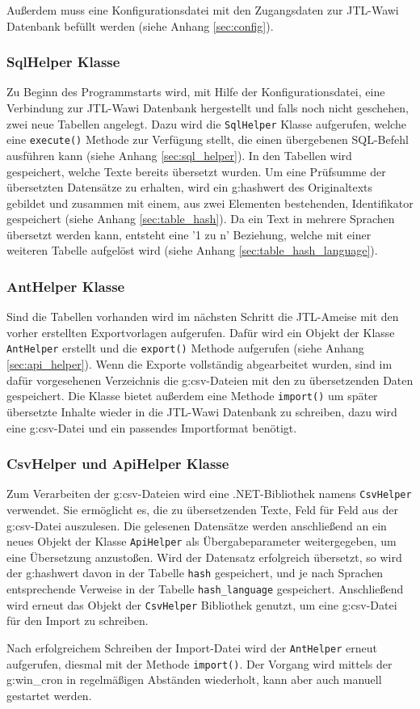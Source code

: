 Außerdem muss eine Konfigurationsdatei mit den Zugangsdaten zur JTL-Wawi Datenbank befüllt werden (siehe Anhang \ref{sec:config}).

\subsubsection{SqlHelper Klasse}
Zu Beginn des Programmstarts wird, mit Hilfe der Konfigurationsdatei, eine Verbindung zur JTL-Wawi Datenbank hergestellt und falls noch nicht geschehen, zwei neue Tabellen angelegt.
Dazu wird die \texttt{SqlHelper} Klasse aufgerufen, welche eine \texttt{execute()} Methode zur Verfügung stellt, die einen übergebenen SQL-Befehl ausführen kann (siehe Anhang \ref{sec:sql_helper}). 
In den Tabellen wird gespeichert, welche Texte bereits übersetzt wurden.
Um eine Prüfsumme der übersetzten Datensätze zu erhalten, wird ein \gls{g:hashwert} des Originaltexts gebildet und zusammen mit einem, aus zwei Elementen bestehenden, Identifikator gespeichert (siehe Anhang \ref{sec:table_hash}). 
Da ein Text in mehrere Sprachen übersetzt werden kann, entsteht eine '1 zu n' Beziehung, welche mit einer weiteren Tabelle aufgelöst wird (siehe Anhang \ref{sec:table_hash_language}).

\subsubsection{AntHelper Klasse}
Sind die Tabellen vorhanden wird im nächsten Schritt die JTL-Ameise mit den vorher erstellten Exportvorlagen aufgerufen.
Dafür wird ein Objekt der Klasse \texttt{AntHelper} erstellt und die \texttt{export()} Methode aufgerufen (siehe Anhang \ref{sec:api_helper}).
Wenn die Exporte vollständig abgearbeitet wurden, sind im dafür vorgesehenen Verzeichnis die \gls{g:csv}-Dateien mit den zu übersetzenden Daten gespeichert.
Die Klasse bietet außerdem eine Methode \texttt{import()} um später übersetzte Inhalte wieder in die JTL-Wawi Datenbank zu schreiben, dazu wird eine \gls{g:csv}-Datei und ein passendes Importformat benötigt.

\subsubsection{CsvHelper und ApiHelper Klasse}
Zum Verarbeiten der \gls{g:csv}-Dateien wird eine .NET-Bibliothek namens \texttt{CsvHelper} verwendet. 
Sie ermöglicht es, die zu übersetzenden Texte, Feld für Feld aus der \gls{g:csv}-Datei auszulesen.
Die gelesenen Datensätze werden anschließend an ein neues Objekt der Klasse \texttt{ApiHelper} als Übergabeparameter weitergegeben, um eine Übersetzung anzustoßen.
Wird der Datensatz erfolgreich übersetzt, so wird der \gls{g:hashwert} davon in der Tabelle \texttt{hash} gespeichert, und je nach Sprachen entsprechende Verweise in der Tabelle \texttt{hash\_language} gespeichert.
Anschließend wird erneut das Objekt der \texttt{CsvHelper} Bibliothek genutzt, um eine \gls{g:csv}-Datei für den Import zu schreiben.

Nach erfolgreichem Schreiben der Import-Datei wird der \texttt{AntHelper} erneut aufgerufen, diesmal mit der Methode \texttt{import()}.
Der Vorgang wird mittels der \gls{g:win_cron} in regelmäßigen Abständen wiederholt, kann aber auch manuell gestartet werden.
